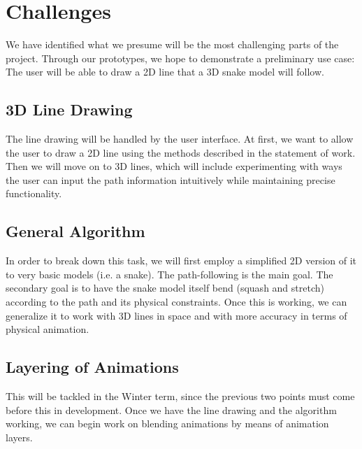 \section{Challenges}
\label{sec:challenges}
We have identified what we presume will be the most challenging parts of the project. Through our prototypes, we hope to demonstrate a preliminary use case: The user will be able to draw a 2D line that a 3D snake model will follow.

\subsection{3D Line Drawing}
The line drawing will be handled by the user interface. At first, we want to allow the user to draw a 2D line using the methods described in the statement of work. Then we will move on to 3D lines, which will include experimenting with ways the user can input the path information intuitively while maintaining precise functionality.
 
\subsection{General Algorithm}
In order to break down this task, we will first employ a simplified 2D version of it to very basic models (i.e. a snake). The path-following is the main goal. The secondary goal is to have the snake model itself bend (squash and stretch) according to the path and its physical constraints. Once this is working, we can generalize it to work with 3D lines in space and with more accuracy in terms of physical animation.

\subsection{Layering of Animations}
This will be tackled in the Winter term, since the previous two points must come before this in development. Once we have the line drawing and the algorithm working, we can begin work on blending animations by means of animation layers.

